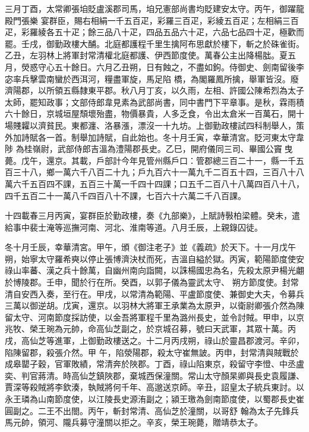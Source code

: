 \begin{pinyinscope}
 三月丁酉，太常卿張垍貶盧溪郡司馬，垍兄憲部尚書均貶建安太守。丙午，御躍龍殿門張樂
 宴群臣，賜右相絹一千五百疋，彩羅三百疋，彩綾五百疋；左相絹三百疋，彩羅綾各五十疋；餘三品八十疋，四品五品六十疋，六品七品四十疋，極歡而罷。壬戌，御勤政樓大酺。北庭都護程千里生擒阿布思獻於樓下，斬之於硃雀街。乙丑，左羽林上將軍封常清權北庭都護、伊西節度使。萬春公主出降楊朏。夏五月，熒惑守心五十餘日。六月乙丑朔，日有蝕之，不盡如鉤。侍御史、劍南留後李宓率兵擊雲南蠻於西洱河，糧盡軍旋，馬足陷
 橋，為閣羅鳳所擒，舉軍皆沒。廢濟陽郡，以所領五縣隸東平郡。秋八月丁亥，以久雨，左相、許國公陳希烈為太子太師，罷知政事；文部侍郎韋見素為武部尚書，同中書門下平章事。是秋，霖雨積六十餘日，京城垣屋頹壞殆盡，物價暴貴，人多乏食，令出太倉米一百萬石，開十場賤糶以濟貧民。東都瀍、洛暴漲，漂沒一十九坊。上御勤政樓試四科制舉人，策外加詩賦各一首。制舉加詩賦，自此始也。冬十月壬寅，幸華清宮。貶河東太守韋陟
 為桂嶺尉，武部侍郎吉溫為澧陽郡長史。乙巳，開府儀同三司、畢國公竇曳薨。戊午，還京。其載，戶部計今年見管州縣戶口：管郡總三百二十一，縣一千五百三十八，鄉一萬六千八百二十九；戶九百六十一萬九千二百五十四，三百八十八萬六千五百四不課，五百三十萬一千四十四課；口五千二百八十八萬四百八十八，四千五百二十一萬八千四百八十不課，七百六十六萬二千八百課。



 十四載春三月丙寅，宴群臣於勤政樓，奏《九部樂》，上賦詩斅柏梁體。癸未，遣給事中裴士淹等巡撫河南、河北、淮南等道。八月壬辰，上親錄囚徒。



 冬十月壬辰，幸華清宮。甲午，頒《御注老子》並《義疏》於天下。十一月戊午朔，始寧太守羅希奭以停止張博濟決杖而死，吉溫自縊於獄。丙寅，範陽節度使安祿山率蕃、漢之兵十餘萬，自幽州南向詣闕，以誅楊國忠為名，先殺太原尹楊光翽於博陵郡。壬申，聞於行在所。癸酉，以郭子儀為靈武太守、
 朔方節度使。封常清自安西入奏，至行在。甲戌，以常清為範陽、平盧節度使、兼御史大夫，令募兵三萬以御逆胡。戊寅，還京。以羽林大將軍王承業為太原尹，以衛尉卿張介然為陳留太守、河南節度採訪使，以金吾將軍程千里為潞州長史，並令討賊。甲申，以京兆牧、榮王琬為元帥，命高仙芝副之，於京城召募，號曰天武軍，其眾十萬。丙戌，高仙芝等進軍，上御勤政樓送之。十二月丙戌朔，祿山於靈昌郡渡河。辛卯，陷陳留郡，殺張介然。甲
 午，陷滎陽郡，殺太守崔無詖。丙申，封常清與賊戰於成皋罌子穀，官軍敗績，常清奔於陜郡。丁酉，祿山陷東京，殺留守李憕、中丞盧奕、判官蔣清。時高仙芝鎮陜郡，棄城西保潼關。常山太守顏杲卿與長史袁履謙、賈深等殺賊將李欽湊，執賊將何千年、高邈送京師。辛丑，詔皇太子統兵東討。以永王璘為山南節度使，以江陵長史源洧副之；潁王璬為劍南節度使，以蜀郡長史崔圓副之。二王不出閤。丙午，斬封常清、高仙芝於潼關，以哥舒
 翰為太子先鋒兵馬元帥，領河、隴兵募守潼關以拒之。辛亥，榮王琬薨，贈靖恭太子。




\end{pinyinscope}
